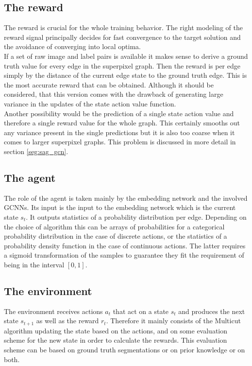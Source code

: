 \subsection{The reward}
The reward is crucial for the whole training behavior. The right modeling of the reward signal principally decides for fast convergence to the target solution and the avoidance of converging into local optima.\\
If a set of raw image and label pairs is available it makes sense to derive a ground truth value for every edge in the superpixel graph. Then the reward is per edge simply by the distance of the current edge state to the ground truth edge. This is the most accurate reward that can be obtained. Although it should be considered, that this version comes with the drawback of generating large variance in the updates of the state action value function.\\
Another possibility would be the prediction of a single state action value and therefore a single reward value for the whole graph. This certainly smooths out any variance present in the single predictions but it is also too coarse when it comes to larger superpixel graphs. This problem is discussed in more detail in section \ref{seg:sag_gcn}.

\subsection{The agent}
The role of the agent is taken mainly by the embedding network and the involved GCNNs. Its input is the input to the embedding network which is the current state $s_t$. It outputs statistics of a probability distribution per edge. Depending on the choice of algorithm this can be arrays of probabilities for a categorical probability distribution in the case of discrete actions, or the statistics of a probability density function in the case of continuous actions. The latter requires a sigmoid transformation of the samples to guarantee they fit the requirement of being in the interval $[0,1]$.

\subsection{The environment}
The environment receives actions $a_t$ that act on a state $s_t$ and produces the next state $s_{t+1}$ as well as the reward $r_t$. Therefore it mainly consists of the Multicut algorithm updating the state based on the actions, and on some evaluation scheme for the new state in order to calculate the rewards. This evaluation scheme can be based on ground truth segmentations or on prior knowledge or on both.


